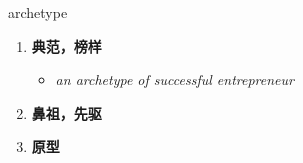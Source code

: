 
\begin{frame}
{\huge archetype}
\begin{center}
\begin{enumerate}\Large
  \item \textbf{典范，榜样}
  \begin{itemize}
    \item \em{\Large{an archetype of successful entrepreneur}}
  \end{itemize}
  \item \textbf{鼻祖，先驱}
  \item \textbf{原型}
\end{enumerate}
\end{center}
\end{frame}
